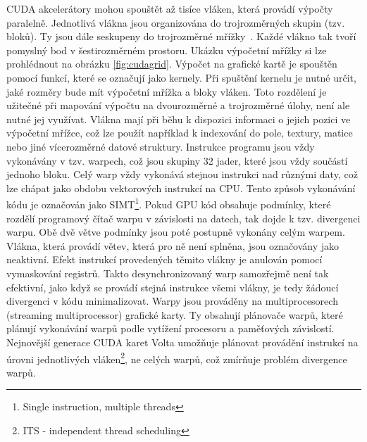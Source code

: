 CUDA akcelerátory mohou spouštět až tisíce vláken, která provádí výpočty paralelně. Jednotlivá vlákna jsou organizována do trojrozměrných skupin (tzv. bloků). Ty jsou dále seskupeny do trojrozměrné mřížky~\cite{cudacguide}. Každé vlákno tak tvoří pomyslný bod v šestirozměrném prostoru. Ukázku výpočetní mřížky si lze prohlédnout na obrázku \ref{fig:cudagrid}. Výpočet na grafické kartě je spouštěn pomocí funkcí, které se označují jako kernely. Při spuštění kernelu je nutné určit, jaké rozměry bude mít výpočetní mřížka a bloky vláken. Toto rozdělení je užitečné při mapování výpočtu na dvourozměrné a trojrozměrné úlohy, není ale nutné jej využívat. Vlákna mají při běhu k dispozici informaci o jejich pozici ve výpočetní mřížce, což lze použít například k indexování do pole, textury, matice nebo jiné vícerozměrné datové struktury. Instrukce programu jsou vždy vykonávány v tzv. warpech, což jsou skupiny 32 jader, které jsou vždy součástí jednoho bloku. Celý warp vždy vykonává stejnou instrukci nad různými daty, což lze chápat jako obdobu vektorových instrukcí na CPU. Tento způsob vykonávání kódu je označován jako SIMT\footnote{Single instruction, multiple threads}. Pokud GPU kód obsahuje podmínky, které rozdělí programový čítač warpu v závislosti na datech, tak dojde k tzv. divergenci warpu. Obě dvě větve podmínky jsou poté postupně vykonány celým warpem. Vlákna, která provádí větev, která pro ně není splněna, jsou označovány jako neaktivní. Efekt instrukcí provedených těmito vlákny je anulován pomocí vymaskování registrů. Takto desynchronizovaný warp samozřejmě není tak efektivní, jako když se provádí stejná instrukce všemi vlákny, je tedy žádoucí divergenci v kódu minimalizovat. Warpy jsou prováděny na multiprocesorech (streaming multiprocessor) grafické karty. Ty obsahují plánovače warpů, které plánují vykonávání warpů podle vytížení procesoru a paměťových závislostí. Nejnovější generace CUDA karet Volta umožňuje plánovat provádění instrukcí na úrovni jednotlivých vláken\footnote{ITS - independent thread scheduling}, ne celých warpů, což zmírňuje problém divergence warpů.


